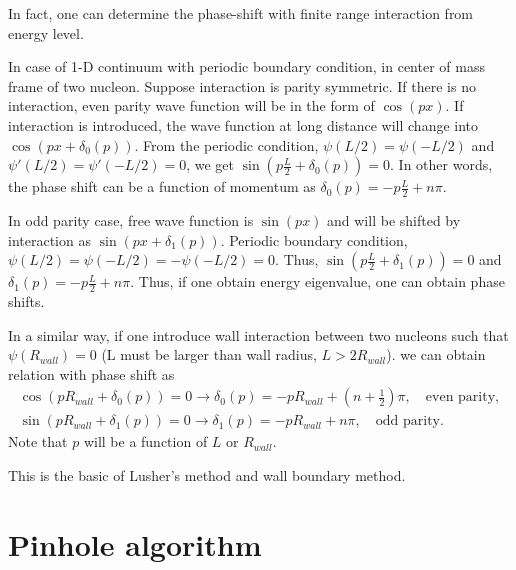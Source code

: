 \documentclass[10pt]{book}
\newcommand{\bea}{\begin{eqnarray}}
\newcommand{\eea}{\end{eqnarray}}
\newcommand{\no}{\nonumber \\}
\begin{document}
In fact, one can determine the phase-shift with finite range interaction
from energy level.

In case of 1-D continuum with periodic boundary condition, in center of mass frame of two nucleon. 
Suppose interaction is parity symmetric.
If there is no interaction, 
even parity wave function will be in the form of $\cos(px)$.
If interaction is introduced, the wave function at long distance will change into 
$\cos(px+\delta_0(p))$.
From the periodic condition, $\psi(L/2)=\psi(-L/2)$
and $\psi'(L/2)=\psi'(-L/2)=0$, we get $\sin(p \frac{L}{2}+\delta_0(p))=0$.
In other words, the phase shift can be a function of momentum as
$\delta_0(p)=-p\frac{L}{2}+n\pi$.

In odd parity case, free wave function is $\sin(px)$ and will be shifted by interaction 
as $\sin(px+\delta_1(p))$. Periodic boundary condition,
$\psi(L/2)=\psi(-L/2)=-\psi(-L/2)=0$. Thus, $\sin(p\frac{L}{2}+\delta_1(p))=0$
and $\delta_1(p)=-p\frac{L}{2}+n\pi$. 
Thus, if one obtain energy eigenvalue, one can obtain phase shifts.

In a similar way, if one introduce wall interaction between two nucleons such that 
$\psi(R_{wall})=0$ (L must be larger than wall radius, $L>2 R_{wall}$).
we can obtain relation with phase shift as
\bea 
\cos(pR_{wall}+\delta_0(p))=0\to \delta_0(p)=-pR_{wall}+(n+\frac{1}{2})\pi, \quad \mbox{even parity},\no 
\sin(pR_{wall}+\delta_1(p))=0\to \delta_1(p)=-pR_{wall}+n\pi, \quad \mbox{odd parity}.
\eea 
Note that $p$ will be a function of $L$ or $R_{wall}$. 

This is the basic of Lusher's method and wall boundary method. 

\chapter{Pinhole algorithm} 
\end{document}
